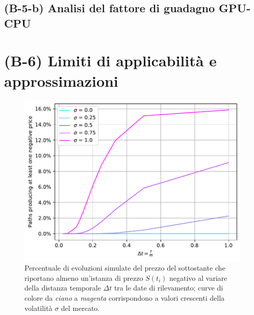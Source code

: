 \subsection{(B-5-b) Analisi del fattore di guadagno GPU-CPU}
\lipsum[1-3]

\section{(B-6) Limiti di applicabilità e approssimazioni} \label{sec:limits}

\begin{figure}[t]
    \centering
    \includegraphics[scale=0.5]{graphs/NegativePrices_PercentageVsM_VariousSigmas.pdf}
    \caption{Percentuale di evoluzioni simulate del prezzo del sottostante che riportano almeno un'istanza di prezzo $S(t_i)$ negativo al variare della distanza temporale $\Delta t$ tra le date di rilevamento; curve di colore da \textit{ciano} a \textit{magenta} corrispondono a valori crescenti della volatilità $\sigma$ del mercato.}
    \label{fig:negativeprices}
\end{figure}
\lipsum[1-3]